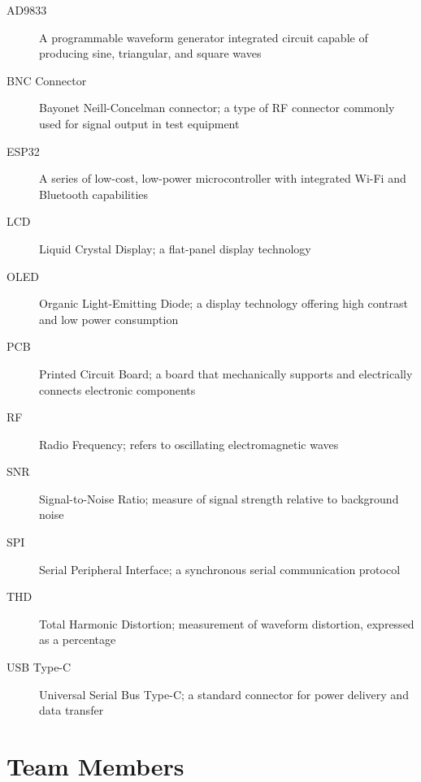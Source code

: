 \documentclass[a4paper,12pt]{article}
\begin{document}
\begin{description}
    \item[AD9833] A programmable waveform generator integrated circuit capable of producing sine, triangular, and square waves
    
    \item[BNC Connector] Bayonet Neill-Concelman connector; a type of RF connector commonly used for signal output in test equipment
    
    
    \item[ESP32] A series of low-cost, low-power microcontroller with integrated Wi-Fi and Bluetooth capabilities
    
    
    \item[LCD] Liquid Crystal Display; a flat-panel display technology
    
    
    \item[OLED] Organic Light-Emitting Diode; a display technology offering high contrast and low power consumption
    
    \item[PCB] Printed Circuit Board; a board that mechanically supports and electrically connects electronic components
    
    \item[RF] Radio Frequency; refers to oscillating electromagnetic waves
    
    \item[SNR] Signal-to-Noise Ratio; measure of signal strength relative to background noise
    
    \item[SPI] Serial Peripheral Interface; a synchronous serial communication protocol
    
    
    \item[THD] Total Harmonic Distortion; measurement of waveform distortion, expressed as a percentage
    
    \item[USB Type-C] Universal Serial Bus Type-C; a standard connector for power delivery and data transfer
    
\end{description}

\newpage
\section{Team Members}
\end{document}
